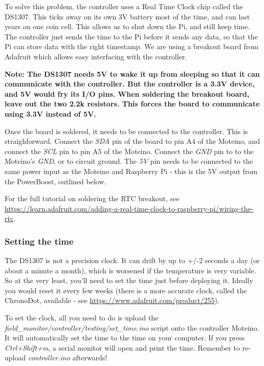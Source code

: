 \documentclass[10pt]{article}
\begin{document}
To solve this problem, the controller uses a Real Time Clock chip called the DS1307. This ticks away on its own 3V battery most of the time, and can last years on one coin cell. This allows us to shut down the Pi, and still keep time. The controller just sends the time to the Pi before it sends any data, so that the Pi can store data with the right timestamp. We are using a breakout board from Adafruit which allows easy interfacing with the controller. \newline

\textbf{Note: The DS1307 needs 5V to wake it up from sleeping so that it can communicate with the controller. But the controller is a 3.3V device, and 5V would fry its I/O pins. When soldering the breakout board, leave out the two 2.2k resistors. This forces the board to communicate using 3.3V instead of 5V.} \newline

Once the board is soldered, it needs to be connected to the controller. This is straighforward. Connect the \textit{SDA} pin of the board to pin A4 of the Moteino, and connect the \textit{SCL} pin to pin A5 of the Moteino. Connect the \textit{GND} pin to to the Moteino's \textit{GND}, or to circuit ground. The \textit{5V} pin needs to be connected to the same power input as the Moteino and Raspberry Pi - this is the 5V output from the PowerBoost, outlined below.

For the full tutorial on soldering the RTC breakout, see \url{https://learn.adafruit.com/adding-a-real-time-clock-to-raspberry-pi/wiring-the-rtc}.

\subsubsection{Setting the time}
The DS1307 is not a precision clock. It can drift by up to  +/-2 seconds a day (or about a minute a month), which is worsened if the temperature is very variable. So at the very least, you'll need to set the time just before deploying it. Ideally you would reset it every few weeks (there is a more accurate clock, called the ChronoDot, available - see \url{https://www.adafruit.com/product/255}).

To set the clock, all you need to do is upload the \textit{field\_monitor/controller/testing/set\_time.ino} script onto the controller Moteino. It will automatically set the time to the time on your computer. If you press \textit{Ctrl+Shift+m}, a serial monitor will open and print the time. Remember to re-upload \textit{controller.ino} afterwards!
\end{document}
